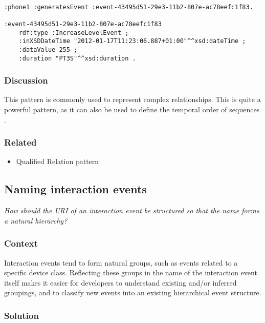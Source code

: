 \begin{verbatim}
	
:phone1 :generatesEvent :event-43495d51-29e3-11b2-807e-ac78eefc1f83. 
	
:event-43495d51-29e3-11b2-807e-ac78eefc1f83 
	rdf:type :IncreaseLevelEvent ;
	:inXSDDateTime "2012-01-17T11:23:06.887+01:00"^^xsd:dateTime ;
	:dataValue 255 ;
	:duration "PT3S"^^xsd:duration .
\end{verbatim}


\subsubsection{Discussion}
This pattern is commonly used to represent complex relationships. This is quite a powerful pattern, as it can also be used to define the temporal order of sequences \cite{Noy2006}.


\subsubsection{Related}

\begin{itemize}
	\item Qualified Relation pattern \cite{Dodds2011}
\end{itemize}






\subsection{Naming interaction events}

\emph{How should the \ac{URI} of an interaction event be structured so that the name forms a natural hierarchy?}

\subsubsection{Context}

Interaction events tend to form natural groups, such as events related to a specific device class. Reflecting these groups in the name of the interaction event itself makes it easier for developers to understand existing and/or inferred groupings, and to classify new events into an existing hierarchical event structure.

\subsubsection{Solution}

